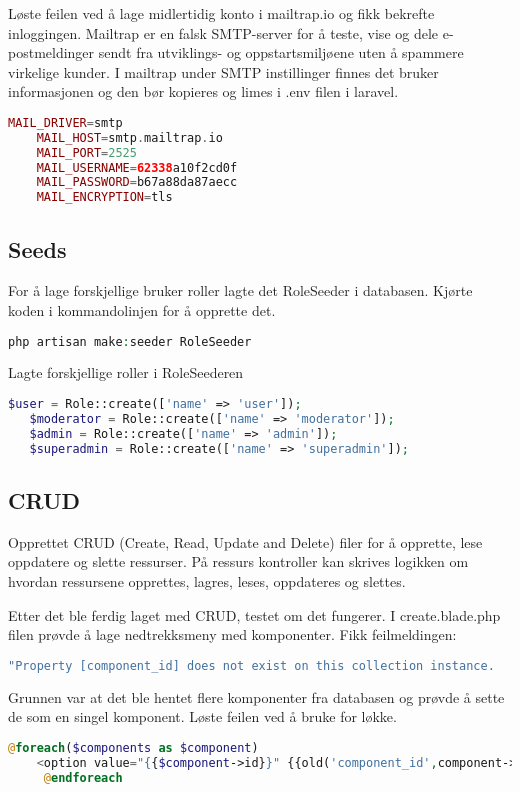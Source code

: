 Løste feilen ved å lage midlertidig konto i mailtrap.io og fikk bekrefte inloggingen.
Mailtrap\cite{mailtrap2019setfsad} er en falsk SMTP-server for å teste, vise og dele e-postmeldinger sendt fra utviklings- og oppstartsmiljøene uten å spammere virkelige kunder.
I mailtrap under SMTP instillinger finnes det bruker informasjonen og den bør kopieres og limes i .env filen i laravel.

\begin{lstlisting}[language=PHP]
    MAIL_DRIVER=smtp
    MAIL_HOST=smtp.mailtrap.io
    MAIL_PORT=2525
    MAIL_USERNAME=62338a10f2cd0f
    MAIL_PASSWORD=b67a88da87aecc
    MAIL_ENCRYPTION=tls
\end{lstlisting}

\subsection{Seeds}
For å lage forskjellige bruker roller lagte det RoleSeeder i databasen.
Kjørte koden i kommandolinjen for å opprette det.
\begin{lstlisting}[language=PHP]
    php artisan make:seeder RoleSeeder
\end{lstlisting}
Lagte forskjellige roller i RoleSeederen
\begin{lstlisting}[language=PHP]
    $user = Role::create(['name' => 'user']);
   $moderator = Role::create(['name' => 'moderator']);
   $admin = Role::create(['name' => 'admin']);
   $superadmin = Role::create(['name' => 'superadmin']);
\end{lstlisting}
\subsection{CRUD}       
Opprettet CRUD (Create, Read, Update and Delete) filer for å opprette, lese oppdatere og slette ressurser. På ressurs kontroller kan skrives logikken om hvordan ressursene opprettes, lagres, leses, oppdateres og slettes. 



Etter det ble ferdig laget med CRUD, testet om det fungerer.
I create.blade.php filen prøvde å lage nedtrekksmeny med komponenter.
Fikk feilmeldingen:
\begin{lstlisting}[language=PHP]
    "Property [component_id] does not exist on this collection instance.
\end{lstlisting}

Grunnen var at det ble hentet flere komponenter fra databasen og prøvde å sette de som en singel komponent.
Løste feilen ved å bruke for løkke.
\begin{lstlisting}[language=PHP]
    @foreach($components as $component)
    <option value="{{$component->id}}" {{old('component_id',component->id)}}? selected> {{$component->name}} </option>
     @endforeach
\end{lstlisting} 


